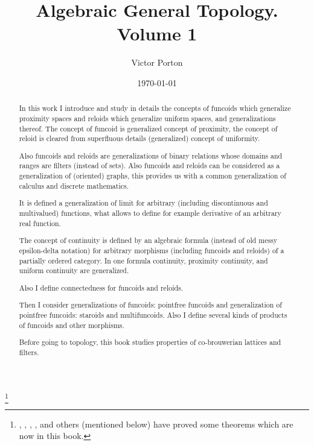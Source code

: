 \documentclass[letterpaper,oneside,english,reqno]{amsbook}
\numberwithin{section}{chapter}
\begin{document}
\title{Algebraic General Topology. Volume 1}


\author{Victor Porton}






\date{\today}


\thanks{, , , , and others (mentioned below) have proved some theorems which are now in this book.}
\begin{abstract}
In this work I introduce and study in details the concepts of funcoids which generalize proximity spaces and reloids which generalize uniform spaces, and generalizations thereof. The concept of funcoid is generalized concept of proximity, the concept of reloid is cleared from superfluous details (generalized) concept of uniformity. 

Also funcoids and reloids are generalizations of binary relations whose domains and ranges are filters (instead of sets). Also funcoids and reloids can be considered as a generalization of (oriented) graphs, this provides us with a common generalization of calculus and discrete mathematics.

It is defined a generalization of limit for arbitrary (including discontinuous and multivalued) functions, what allows to define for example derivative of an arbitrary real function.

The concept of continuity is defined by an algebraic formula (instead of old messy epsilon-delta notation) for arbitrary morphisms (including funcoids and reloids) of a partially ordered category. In one formula continuity, proximity continuity, and uniform continuity are generalized.

Also I define connectedness for funcoids and reloids.

Then I consider generalizations of funcoids: pointfree funcoids and generalization of pointfree funcoids: staroids and multifuncoids. Also I define several kinds of products of funcoids and other morphisms.

Before going to topology, this book studies properties of co-brouwerian lattices and filters.
\end{abstract}


\end{document}
